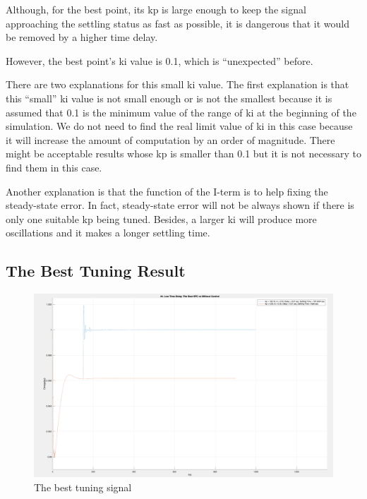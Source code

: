 Although, for the best point, its kp is large enough to keep the signal approaching the settling status as fast as possible, it is dangerous that it would be removed by a higher time delay. 

However, the best point's ki value is 0.1, which is “unexpected” before.  

There are two explanations for this small ki value. The first explanation is that this “small” ki value is not small enough or is not the smallest because it is assumed that 0.1 is the minimum value of the range of ki at the beginning of the simulation. We do not need to find the real limit value of ki in this case because it will increase the amount of computation by an order of magnitude. There might be acceptable results whose kp is smaller than 0.1 but it is not necessary to find them in this case.  

Another explanation is that the function of the I-term is to help fixing the steady-state error. In fact, steady-state error will not be always shown if there is only one suitable kp being tuned. Besides, a larger ki will produce more oscillations and it makes a longer settling time.  


\subsection{The Best Tuning Result} %

\begin{figure}[htbp]
\centering
\includegraphics[width = .819\textwidth]{figure/4_4_2_best.png}
\caption{The best tuning signal}
\label{4_4_2_best}
\end{figure}